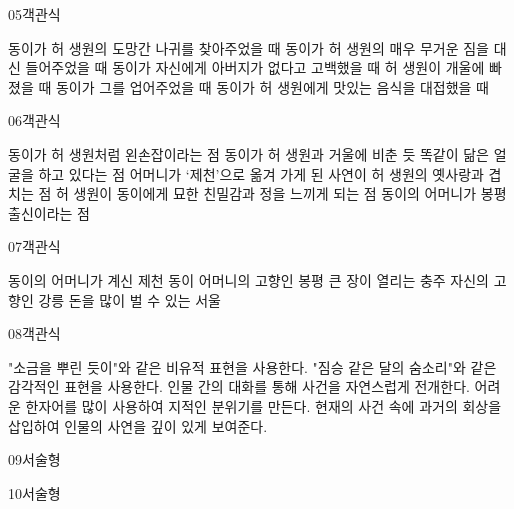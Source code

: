 \documentclass[fs85,seriesRus]{korfarm-base}
\begin{document}
\begin{kfQBlock}{05}{객관식}
\begin{kfChoices}
\kfChoice 동이가 허 생원의 도망간 나귀를 찾아주었을 때
\kfChoice 동이가 허 생원의 매우 무거운 짐을 대신 들어주었을 때
\kfChoice 동이가 자신에게 아버지가 없다고 고백했을 때
\kfChoice 허 생원이 개울에 빠졌을 때 동이가 그를 업어주었을 때
\kfChoice 동이가 허 생원에게 맛있는 음식을 대접했을 때
\end{kfChoices}
\end{kfQBlock}
\begin{kfQBlock}{06}{객관식}
\begin{kfChoices}
\kfChoice 동이가 허 생원처럼 왼손잡이라는 점
\kfChoice 동이가 허 생원과 거울에 비춘 듯 똑같이 닮은 얼굴을 하고 있다는 점
\kfChoice 어머니가 ‘제천’으로 옮겨 가게 된 사연이 허 생원의 옛사랑과 겹치는 점
\kfChoice 허 생원이 동이에게 묘한 친밀감과 정을 느끼게 되는 점
\kfChoice 동이의 어머니가 봉평 출신이라는 점
\end{kfChoices}
\end{kfQBlock}
\begin{kfQBlock}{07}{객관식}
\begin{kfChoices}
\kfChoice 동이의 어머니가 계신 제천
\kfChoice 동이 어머니의 고향인 봉평
\kfChoice 큰 장이 열리는 충주
\kfChoice 자신의 고향인 강릉
\kfChoice 돈을 많이 벌 수 있는 서울
\end{kfChoices}
\end{kfQBlock}
\begin{kfQBlock}{08}{객관식}
\begin{kfChoices}
\kfChoice "소금을 뿌린 듯이"와 같은 비유적 표현을 사용한다.
\kfChoice "짐승 같은 달의 숨소리"와 같은 감각적인 표현을 사용한다.
\kfChoice 인물 간의 대화를 통해 사건을 자연스럽게 전개한다.
\kfChoice 어려운 한자어를 많이 사용하여 지적인 분위기를 만든다.
\kfChoice 현재의 사건 속에 과거의 회상을 삽입하여 인물의 사연을 깊이 있게 보여준다.
\end{kfChoices}
\end{kfQBlock}
\begin{kfQBlock}{09}{서술형}
\end{kfQBlock}
\begin{kfQBlock}{10}{서술형}
\end{kfQBlock}
\kfEndMC
\end{document}
